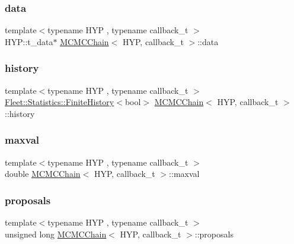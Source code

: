 \mbox{\label{class_m_c_m_c_chain_a62ffa9a3d173a79c82f09174b58aebaf}} 
\subsubsection{\texorpdfstring{data}{data}}
{\footnotesize\ttfamily template$<$typename H\+YP , typename callback\+\_\+t $>$ \\
H\+Y\+P\+::t\+\_\+data$\ast$ \hyperlink{class_m_c_m_c_chain}{M\+C\+M\+C\+Chain}$<$ H\+YP, callback\+\_\+t $>$\+::data}

\mbox{\label{class_m_c_m_c_chain_a2595f417e0c9cc847ac1dd70ed8b0763}} 
\subsubsection{\texorpdfstring{history}{history}}
{\footnotesize\ttfamily template$<$typename H\+YP , typename callback\+\_\+t $>$ \\
\hyperlink{class_fleet_1_1_statistics_1_1_finite_history}{Fleet\+::\+Statistics\+::\+Finite\+History}$<$bool$>$ \hyperlink{class_m_c_m_c_chain}{M\+C\+M\+C\+Chain}$<$ H\+YP, callback\+\_\+t $>$\+::history}

\mbox{\label{class_m_c_m_c_chain_a3b8d31f47d75503321b432eeac0bb13b}} 
\subsubsection{\texorpdfstring{maxval}{maxval}}
{\footnotesize\ttfamily template$<$typename H\+YP , typename callback\+\_\+t $>$ \\
double \hyperlink{class_m_c_m_c_chain}{M\+C\+M\+C\+Chain}$<$ H\+YP, callback\+\_\+t $>$\+::maxval}

\mbox{\label{class_m_c_m_c_chain_aec2cdd6a3e25447c7f34e31d0d98dbcb}} 
\subsubsection{\texorpdfstring{proposals}{proposals}}
{\footnotesize\ttfamily template$<$typename H\+YP , typename callback\+\_\+t $>$ \\
unsigned long \hyperlink{class_m_c_m_c_chain}{M\+C\+M\+C\+Chain}$<$ H\+YP, callback\+\_\+t $>$\+::proposals}

